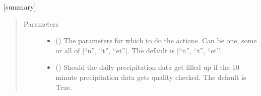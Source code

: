 \documentclass[letterpaper,10pt,english]{sphinxmanual}
\begin{document}
\begin{fulllineitems}

\begin{fulllineitems}
\label{\detokenize{weatherDB:weatherDB.broker.Broker.new_import}}
\end{fulllineitems}


\begin{fulllineitems}
\label{\detokenize{weatherDB:weatherDB.broker.Broker.quality_check}}
\sphinxAtStartPar
{[}summary{]}
\begin{quote}\begin{description}
\item[{Parameters}] \leavevmode\begin{itemize}
\item {} 
\sphinxAtStartPar
{} (\sphinxstyleliteralemphasis{\sphinxupquote{, }}) \textendash{} The parameters for which to do the actions.
Can be one, some or all of {[}“n”, “t”, “et”{]}.
The default is {[}“n”, “t”, “et”{]}.

\item {} 
\sphinxAtStartPar
{} (\sphinxstyleliteralemphasis{\sphinxupquote{, }}) \textendash{} Should the daily precipitation data get filled up if the 10 minute precipitation data gets quality checked.
The default is True.

\end{itemize}

\end{description}\end{quote}

\end{fulllineitems}


\end{fulllineitems}
\end{document}
